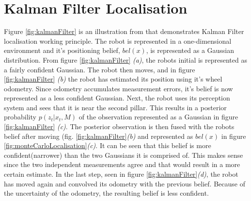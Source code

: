 \section{Kalman Filter Localisation} \label{A:KalmanFilterLocalisation}
Figure \ref{fig:kalmanFilter} is an illustration from \cite{SiegwartRoland2011Itam} that demonstrates Kalman Filter localisation working principle. The robot is represented in a one-dimensional environment and it's positioning belief, $bel(x)$, is represented as a Gaussian distribution. From figure \ref{fig:kalmanFilter} \textit{(a)}, the robots initial is represented as a fairly confident Gaussian. The robot then moves, and in figure \ref{fig:kalmanFilter} \textit{(b)} the robot has estimated its position using it's wheel odometry. Since odometry accumulates measurement errors, it's belief is now represented as a less confident Gaussian. Next, the robot uses its perception system and sees that it is near the second pillar. This results in a posterior probability $p(z_t | x_t,M)$ of the observation represented as a Gaussian in figure \ref{fig:kalmanFilter} \textit{(c)}. The posterior observation is then fused with the robots belief after moving (fig. \ref{fig:kalmanFilter}\textit{(b)} and represented as $bel(x)$ in figure \ref{fig:monteCarloLocalisation}\textit{(c)}. It can be seen that this belief is more confident(narrower) than the two Gaussians it is comprised of. This makes sense since the two independent measurements agree and that would result in a more certain estimate. In the last step, seen in figure \ref{fig:kalmanFilter}\textit{(d)}, the robot has moved again and convolved its odometry with the previous belief. Because of the uncertainty of the odometry, the resulting belief is less confident.

